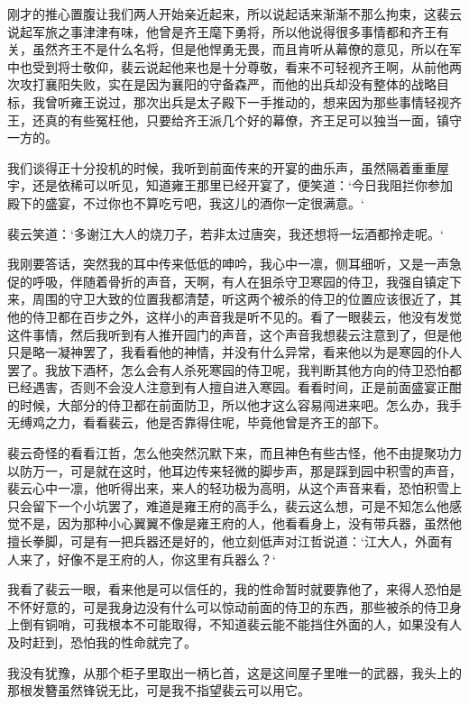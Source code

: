 刚才的推心置腹让我们两人开始亲近起来，所以说起话来渐渐不那么拘束，这裴云说起军旅之事津津有味，他曾是齐王麾下勇将，所以他说得很多事情都和齐王有关，虽然齐王不是什么名将，但是他悍勇无畏，而且肯听从幕僚的意见，所以在军中也受到将士敬仰，裴云说起他来也是十分尊敬，看来不可轻视齐王啊，从前他两次攻打襄阳失败，实在是因为襄阳的守备森严，而他的出兵却没有整体的战略目标，我曾听雍王说过，那次出兵是太子殿下一手推动的，想来因为那些事情轻视齐王，还真的有些冤枉他，只要给齐王派几个好的幕僚，齐王足可以独当一面，镇守一方的。

我们谈得正十分投机的时候，我听到前面传来的开宴的曲乐声，虽然隔着重重屋宇，还是依稀可以听见，知道雍王那里已经开宴了，便笑道：‘今日我阻拦你参加殿下的盛宴，不过你也不算吃亏吧，我这儿的酒你一定很满意。‘

裴云笑道：‘多谢江大人的烧刀子，若非太过唐突，我还想将一坛酒都拎走呢。‘

我刚要答话，突然我的耳中传来低低的呻吟，我心中一凛，侧耳细听，又是一声急促的呼吸，伴随着骨折的声音，天啊，有人在狙杀守卫寒园的侍卫，我强自镇定下来，周围的守卫大致的位置我都清楚，听这两个被杀的侍卫的位置应该很近了，其他的侍卫都在百步之外，这样小的声音我是听不见的。看了一眼裴云，他没有发觉这件事情，然后我听到有人推开园门的声音，这个声音我想裴云注意到了，但是他只是略一凝神罢了，我看看他的神情，并没有什么异常，看来他以为是寒园的仆人罢了。我放下酒杯，怎么会有人杀死寒园的侍卫呢，我判断其他方向的侍卫恐怕都已经遇害，否则不会没人注意到有人擅自进入寒园。看看时间，正是前面盛宴正酣的时候，大部分的侍卫都在前面防卫，所以他才这么容易闯进来吧。怎么办，我手无缚鸡之力，看看裴云，他是否靠得住呢，毕竟他曾是齐王的部下。

裴云奇怪的看看江哲，怎么他突然沉默下来，而且神色有些古怪，他不由提聚功力以防万一，可是就在这时，他耳边传来轻微的脚步声，那是踩到园中积雪的声音，裴云心中一凛，他听得出来，来人的轻功极为高明，从这个声音来看，恐怕积雪上只会留下一个小坑罢了，难道是雍王府的高手么，裴云这么想，可是不知怎么他感觉不是，因为那种小心翼翼不像是雍王府的人，他看看身上，没有带兵器，虽然他擅长拳脚，可是有一把兵器还是好的，他立刻低声对江哲说道：‘江大人，外面有人来了，好像不是王府的人，你这里有兵器么？‘

我看了裴云一眼，看来他是可以信任的，我的性命暂时就要靠他了，来得人恐怕是不怀好意的，可是我身边没有什么可以惊动前面的侍卫的东西，那些被杀的侍卫身上倒有铜哨，可我根本不可能取得，不知道裴云能不能挡住外面的人，如果没有人及时赶到，恐怕我的性命就完了。

我没有犹豫，从那个柜子里取出一柄匕首，这是这间屋子里唯一的武器，我头上的那根发簪虽然锋锐无比，可是我不指望裴云可以用它。

